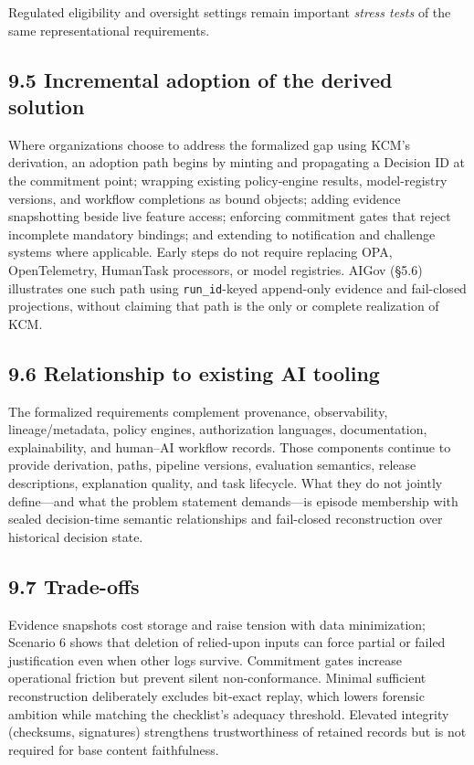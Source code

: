 \documentclass[11pt,a4paper]{article}
\begin{document}
Regulated eligibility and oversight settings remain important \emph{stress tests} of the same representational requirements.


\subsection{9.5 Incremental adoption of the derived solution}

Where organizations choose to address the formalized gap using KCM's derivation, an adoption path begins by minting and propagating a Decision ID at the commitment point; wrapping existing policy-engine results, model-registry versions, and workflow completions as bound objects; adding evidence snapshotting beside live feature access; enforcing commitment gates that reject incomplete mandatory bindings; and extending to notification and challenge systems where applicable. Early steps do not require replacing OPA, OpenTelemetry, HumanTask processors, or model registries. AIGov (\S5.6) illustrates one such path using \texttt{run\_id}-keyed append-only evidence and fail-closed projections, without claiming that path is the only or complete realization of KCM.


\subsection{9.6 Relationship to existing AI tooling}

The formalized requirements complement provenance, observability, lineage/metadata, policy engines, authorization languages, documentation, explainability, and human--AI workflow records. Those components continue to provide derivation, paths, pipeline versions, evaluation semantics, release descriptions, explanation quality, and task lifecycle. What they do not jointly define---and what the problem statement demands---is episode membership with sealed decision-time semantic relationships and fail-closed reconstruction over historical decision state.


\subsection{9.7 Trade-offs}

Evidence snapshots cost storage and raise tension with data minimization; Scenario 6 shows that deletion of relied-upon inputs can force partial or failed justification even when other logs survive. Commitment gates increase operational friction but prevent silent non-conformance. Minimal sufficient reconstruction deliberately excludes bit-exact replay, which lowers forensic ambition while matching the checklist's adequacy threshold. Elevated integrity (checksums, signatures) strengthens trustworthiness of retained records but is not required for base content faithfulness.
\end{document}
